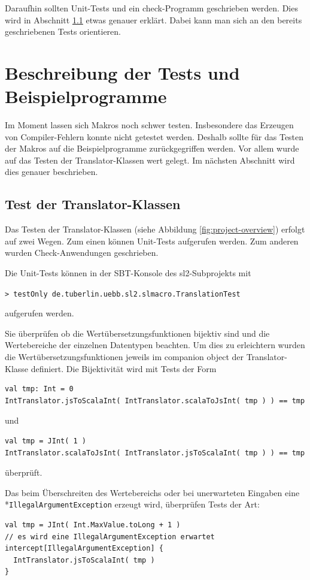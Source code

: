 \documentclass[12pt,bibtotoc]{scrreprt}
\begin{document}
Daraufhin sollten Unit-Tests und ein check-Programm geschrieben werden. Dies wird in Abschnitt \ref{sec:test-translators} etwas genauer erklärt. Dabei kann man sich an den bereits geschriebenen Tests orientieren.

\chapter{Beschreibung der Tests und Beispielprogramme}
\label{chap:tests-and-examples}

Im Moment lassen sich Makros noch schwer testen. Insbesondere das Erzeugen von Compiler-Fehlern konnte nicht getestet werden. Deshalb sollte für das Testen der Makros auf die Beispielprogramme zurückgegriffen werden.  Vor allem wurde auf das Testen der Translator-Klassen wert gelegt. Im nächsten Abschnitt wird dies genauer beschrieben. 

\section{Test der Translator-Klassen}
\label{sec:test-translators}

Das Testen der Translator-Klassen (siehe Abbildung \ref{fig:project-overview}) erfolgt auf zwei Wegen. Zum einen können Unit-Tests aufgerufen werden. Zum anderen wurden Check-Anwendungen geschrieben.

Die Unit-Tests können in der SBT-Konsole des sl2-Subprojekts mit

\begin{centering}
\lstinline!> testOnly de.tuberlin.uebb.sl2.slmacro.TranslationTest!\\
\end{centering}
aufgerufen werden.

Sie überprüfen ob die Wertübersetzungsfunktionen bijektiv sind und die Wertebereiche der einzelnen Datentypen beachten. Um dies zu erleichtern wurden die Wertübersetzungsfunktionen jeweils im companion object der Translator-Klasse definiert.  Die Bijektivität wird mit Tests der Form 
\begin{lstlisting}
val tmp: Int = 0
IntTranslator.jsToScalaInt( IntTranslator.scalaToJsInt( tmp ) ) == tmp
\end{lstlisting}
und
\begin{lstlisting}
val tmp = JInt( 1 )
IntTranslator.scalaToJsInt( IntTranslator.jsToScalaInt( tmp ) ) == tmp
\end{lstlisting}
überprüft.

Das beim Überschreiten des Wertebereichs oder bei unerwarteten Eingaben eine\\*\lstinline!IllegalArgumentException! erzeugt wird, überprüfen Tests der Art:
\begin{lstlisting}
val tmp = JInt( Int.MaxValue.toLong + 1 )
// es wird eine IllegalArgumentException erwartet
intercept[IllegalArgumentException] { 
  IntTranslator.jsToScalaInt( tmp )
}
\end{lstlisting} 
\end{document}
